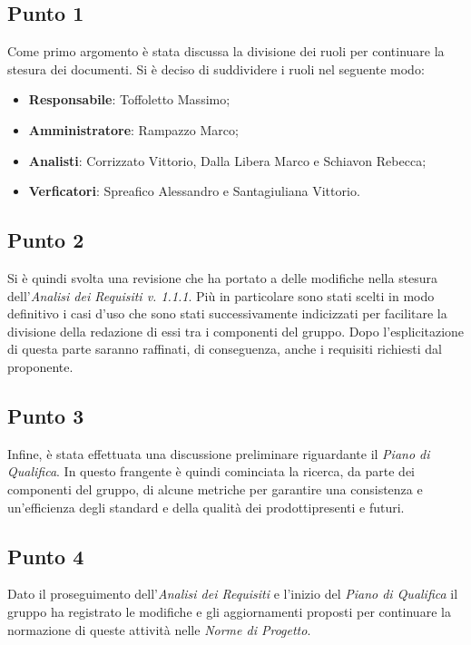     \subsection{Punto 1}
        Come primo argomento è stata discussa la divisione dei ruoli per continuare la stesura dei documenti. Si è deciso di suddividere i ruoli nel seguente modo:
        \begin{itemize}
            \item \textbf{Responsabile}: Toffoletto Massimo;
            \item \textbf{Amministratore}: Rampazzo Marco;
            \item \textbf{Analisti}: Corrizzato Vittorio, Dalla Libera Marco e Schiavon Rebecca;
            \item \textbf{Verficatori}: Spreafico Alessandro e Santagiuliana Vittorio. 
        \end{itemize}
    \subsection{Punto 2}
        Si è quindi svolta una revisione che ha portato a delle modifiche nella stesura dell'\textit{Analisi dei Requisiti v. 1.1.1}. Più in particolare sono stati scelti in modo definitivo i casi d'uso che sono stati successivamente indicizzati per facilitare la divisione della redazione di essi tra i componenti del gruppo. Dopo l'esplicitazione di questa parte saranno raffinati, di conseguenza, anche i requisiti richiesti dal proponente.
    \subsection{Punto 3}
        Infine, è stata effettuata una discussione preliminare riguardante il \textit{Piano di Qualifica}. In questo frangente è quindi cominciata la ricerca, da parte dei componenti del gruppo, di alcune metriche per garantire una consistenza e un'efficienza degli standard e della qualità dei prodotti\glosp presenti e futuri.
    \subsection{Punto 4}
        Dato il proseguimento dell'\textit{Analisi dei Requisiti} e l'inizio del \textit{Piano di Qualifica} il gruppo ha registrato le modifiche e gli aggiornamenti proposti per continuare la normazione di queste attività nelle \textit{Norme di Progetto}.